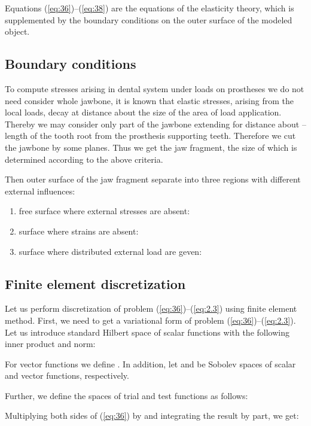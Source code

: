 \documentclass{elsarticle}
\begin{document}
Equations (\ref{eq:36})--(\ref{eq:38}) are the equations of the
elasticity theory, which is supplemented by the boundary conditions on
the outer surface of the modeled object. 


\subsection{Boundary conditions} 

To compute stresses arising in dental system under loads on prostheses
we do not need consider whole jawbone, it is known that elastic
stresses, arising from the local loads, decay at distance about the
size of the area of load application. Thereby we may consider only
part of the jawbone extending for distance about -- length of
the tooth root from the prosthesis supporting teeth. Therefore we cut the
jawbone by some planes. Thus we get the jaw fragment, the size of
which is determined according to the above criteria.

Then outer surface  of the jaw fragment separate into three
regions with different external influences:
\begin{enumerate}
\item free surface where external stresses are absent:
  
\item surface where strains are absent: 
  
\item surface where distributed external load are geven:
  
\end{enumerate}


\subsection{Finite element discretization}

Let us perform discretization of problem (\ref{eq:36})--(\ref{eq:2.3})
using finite element method. First, we need to get a variational form
of problem (\ref{eq:36})--(\ref{eq:2.3}). Let us introduce standard
Hilbert space of scalar functions  with the following
inner product and norm:

For vector functions we define . In addition, let  and
 be Sobolev spaces of scalar and vector
functions, respectively.

Further, we define the spaces of trial and test functions as follows:

Multiplying both sides of (\ref{eq:36}) by 
and integrating the result by part, we get:
\end{document}
